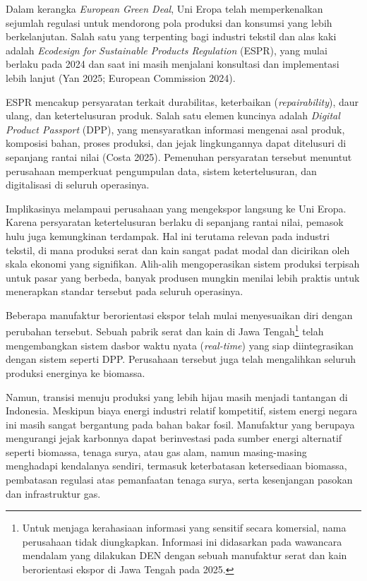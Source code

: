 \documentclass[
  manuscript=article,
  layout=publish,
  year=2026,
  volume=1,
]{den}
\begin{document}
Dalam kerangka \emph{European Green Deal}, Uni Eropa telah
memperkenalkan sejumlah regulasi untuk mendorong pola produksi dan
konsumsi yang lebih berkelanjutan. Salah satu yang terpenting bagi
industri tekstil dan alas kaki adalah \emph{Ecodesign for Sustainable
Products Regulation} (ESPR), yang mulai berlaku pada 2024 dan saat ini
masih menjalani konsultasi dan implementasi lebih lanjut (Yan 2025;
European Commission 2024).

ESPR mencakup persyaratan terkait durabilitas, keterbaikan
(\emph{repairability}), daur ulang, dan ketertelusuran produk. Salah
satu elemen kuncinya adalah \emph{Digital Product Passport} (DPP), yang
mensyaratkan informasi mengenai asal produk, komposisi bahan, proses
produksi, dan jejak lingkungannya dapat ditelusuri di sepanjang rantai
nilai (Costa 2025). Pemenuhan persyaratan tersebut menuntut perusahaan
memperkuat pengumpulan data, sistem ketertelusuran, dan digitalisasi di
seluruh operasinya.

Implikasinya melampaui perusahaan yang mengekspor langsung ke Uni Eropa.
Karena persyaratan ketertelusuran berlaku di sepanjang rantai nilai,
pemasok hulu juga kemungkinan terdampak. Hal ini terutama relevan pada
industri tekstil, di mana produksi serat dan kain sangat padat modal dan
dicirikan oleh skala ekonomi yang signifikan. Alih-alih mengoperasikan
sistem produksi terpisah untuk pasar yang berbeda, banyak produsen
mungkin menilai lebih praktis untuk menerapkan standar tersebut pada
seluruh operasinya.

Beberapa manufaktur berorientasi ekspor telah mulai menyesuaikan diri
dengan perubahan tersebut. Sebuah pabrik serat dan kain di Jawa
Tengah\footnote{Untuk menjaga kerahasiaan informasi yang sensitif secara
  komersial, nama perusahaan tidak diungkapkan. Informasi ini didasarkan
  pada wawancara mendalam yang dilakukan DEN dengan sebuah manufaktur
  serat dan kain berorientasi ekspor di Jawa Tengah pada 2025.} telah
mengembangkan sistem dasbor waktu nyata (\emph{real-time}) yang siap
diintegrasikan dengan sistem seperti DPP. Perusahaan tersebut juga telah
mengalihkan seluruh produksi energinya ke biomassa.

Namun, transisi menuju produksi yang lebih hijau masih menjadi tantangan
di Indonesia. Meskipun biaya energi industri relatif kompetitif, sistem
energi negara ini masih sangat bergantung pada bahan bakar fosil.
Manufaktur yang berupaya mengurangi jejak karbonnya dapat berinvestasi
pada sumber energi alternatif seperti biomassa, tenaga surya, atau gas
alam, namun masing-masing menghadapi kendalanya sendiri, termasuk
keterbatasan ketersediaan biomassa, pembatasan regulasi atas pemanfaatan
tenaga surya, serta kesenjangan pasokan dan infrastruktur gas.
\end{document}
